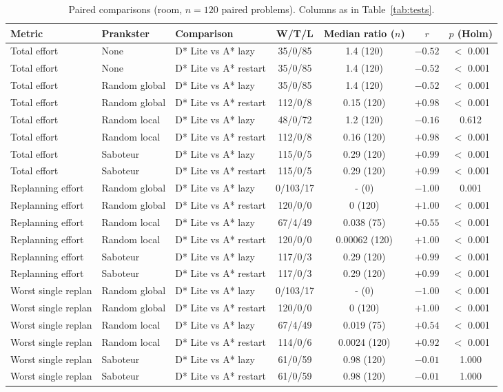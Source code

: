 \begin{table}[!t]
\centering
\footnotesize
\caption{Paired comparisons (room, $n=120$ paired problems). Columns as in Table~\ref{tab:tests}.}
\label{tab:tests-room}
\begin{tabular}{lllcccc}
\toprule
Metric & Prankster & Comparison & W/T/L & Median ratio ($n$) & $r$ & $p$ (Holm) \\
\midrule
Total effort & None & D* Lite vs A* lazy & 35/0/85 & 1.4 (120) & $-0.52$ & $<$ 0.001 \\
Total effort & None & D* Lite vs A* restart & 35/0/85 & 1.4 (120) & $-0.52$ & $<$ 0.001 \\
Total effort & Random global & D* Lite vs A* lazy & 35/0/85 & 1.4 (120) & $-0.52$ & $<$ 0.001 \\
Total effort & Random global & D* Lite vs A* restart & 112/0/8 & 0.15 (120) & $+0.98$ & $<$ 0.001 \\
Total effort & Random local & D* Lite vs A* lazy & 48/0/72 & 1.2 (120) & $-0.16$ & 0.612 \\
Total effort & Random local & D* Lite vs A* restart & 112/0/8 & 0.16 (120) & $+0.98$ & $<$ 0.001 \\
Total effort & Saboteur & D* Lite vs A* lazy & 115/0/5 & 0.29 (120) & $+0.99$ & $<$ 0.001 \\
Total effort & Saboteur & D* Lite vs A* restart & 115/0/5 & 0.29 (120) & $+0.99$ & $<$ 0.001 \\
\midrule
Replanning effort & Random global & D* Lite vs A* lazy & 0/103/17 & - (0) & $-1.00$ & 0.001 \\
Replanning effort & Random global & D* Lite vs A* restart & 120/0/0 & 0 (120) & $+1.00$ & $<$ 0.001 \\
Replanning effort & Random local & D* Lite vs A* lazy & 67/4/49 & 0.038 (75) & $+0.55$ & $<$ 0.001 \\
Replanning effort & Random local & D* Lite vs A* restart & 120/0/0 & 0.00062 (120) & $+1.00$ & $<$ 0.001 \\
Replanning effort & Saboteur & D* Lite vs A* lazy & 117/0/3 & 0.29 (120) & $+0.99$ & $<$ 0.001 \\
Replanning effort & Saboteur & D* Lite vs A* restart & 117/0/3 & 0.29 (120) & $+0.99$ & $<$ 0.001 \\
\midrule
Worst single replan & Random global & D* Lite vs A* lazy & 0/103/17 & - (0) & $-1.00$ & $<$ 0.001 \\
Worst single replan & Random global & D* Lite vs A* restart & 120/0/0 & 0 (120) & $+1.00$ & $<$ 0.001 \\
Worst single replan & Random local & D* Lite vs A* lazy & 67/4/49 & 0.019 (75) & $+0.54$ & $<$ 0.001 \\
Worst single replan & Random local & D* Lite vs A* restart & 114/0/6 & 0.0024 (120) & $+0.92$ & $<$ 0.001 \\
Worst single replan & Saboteur & D* Lite vs A* lazy & 61/0/59 & 0.98 (120) & $-0.01$ & 1.000 \\
Worst single replan & Saboteur & D* Lite vs A* restart & 61/0/59 & 0.98 (120) & $-0.01$ & 1.000 \\
\bottomrule
\end{tabular}
\end{table}
